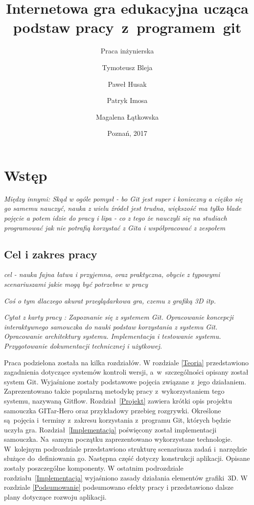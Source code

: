 \documentclass[12pt,a4paper,polish,thesis]{dcsbook}
\begin{document}
	\author{Tymoteusz Bleja \and Paweł Husak \and Patryk Imosa \and Magalena Łątkowska}
	\title{Internetowa gra edukacyjna ucząca podstaw pracy~z~programem~git}
	\subtitle{Praca inżynierska}
	\date{Poznań, 2017}
	\maketitle
	\frontmatter
	\tableofcontents{}
	\mainmatter

	\chapter{Wstęp}

	\textit{Między innymi:
	Skąd w ogóle pomysł - bo Git jest super i konieczny a ciężko się go samemu nauczyć, nauka z wielu źródeł jest trudna, większość ma tylko blade pojęcie a potem idzie do pracy i lipa - co z tego że nauczyli się na studiach programować jak nie potrafią korzystać z Gita i współpracować z zespołem}

	\section*{Cel i zakres pracy}

	\textit{cel - nauka fajna łatwa i przyjemna, oraz praktyczna, obycie z typowymi scenariuszami jakie mogą być potrzebne w pracy}

	\textit{Coś o tym dlaczego akurat przeglądarkowa gra, czemu z grafiką 3D itp.}

	\textit{Cytat z karty pracy : Zapoznanie się z systemem Git. Opracowanie koncepcji interaktywnego samouczka do nauki podstaw korzystania z systemu Git.  Opracowanie architektury systemu. Implementacja i testowanie systemu. Przygotowanie dokumentacji technicznej i użytkowej.}

	Praca podzielona została na kilka rozdziałów. W rozdziale \ref{Teoria} przedstawiono zagadnienia dotyczące systemów kontroli wersji, a~w~szczególności opisany został system Git. Wyjaśnione zostały podstawowe pojęcia związane z~jego działaniem. Zaprezentowano także popularną metodykę pracy z~wykorzystaniem tego systemu, nazywaną Gitflow. Rozdział~\ref{Projekt} zawiera krótki opis projektu samouczka GITar-Hero oraz przykładowy przebieg rozgrywki. Określone są~pojęcia i~terminy z~zakresu korzystania z~programu Git, których będzie uczyła gra. Rozdział~\ref{Implementacja} poświęcony został implementacji samouczka. Na~samym początku zaprezentowano wykorzystane technologie. W~kolejnym podrozdziale przedstawiono strukturę scenariusza zadań i~narzędzie służące do~definiowania go. Następna część dotyczy konstrukcji aplikacji. Opisane zostały poszczególne komponenty. W ostatnim podrozdziale rozdziału~\ref{Implementacja} wyjaśniono zasady działania elementów grafiki~3D. W rozdziale \ref{Podsumowanie} podsumowano efekty pracy i przedstawiono dalsze plany dotyczące rozwoju aplikacji.
\end{document}
